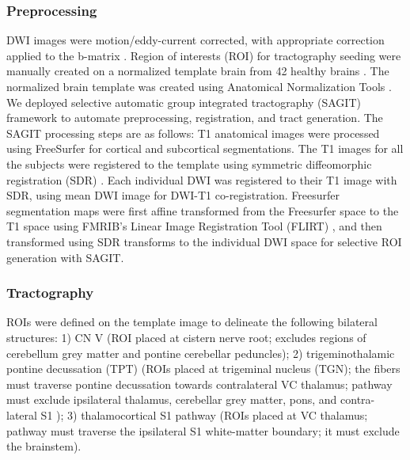 \subsubsection{Preprocessing}
DWI images were motion/eddy-current corrected, with appropriate correction applied to the b-matrix \cite{Leemans2009}. Region of interests (ROI) for tractography seeding were manually created on a normalized template brain from 42 healthy brains \cite{Chen2016}. The normalized brain template was created using Anatomical Normalization Tools \cite{Avants2010,Avants2011}. We deployed selective automatic group integrated tractography (SAGIT) framework \cite{Chen2016} to automate preprocessing, registration, and tract generation. The SAGIT processing steps are as follows: T1 anatomical images were processed using FreeSurfer \cite{Fischl2004} for cortical and subcortical segmentations. The T1 images for all the subjects were registered to the template using symmetric diffeomorphic registration (SDR) \cite{Avants2008b}. Each individual DWI was registered to their T1 image with SDR, using mean DWI image for DWI-T1 co-registration. Freesurfer segmentation maps were first affine transformed from the Freesurfer space to the T1 space using FMRIB's Linear Image Registration Tool (FLIRT) \cite{Jenkinson2001,Jenkinson2002}, and then transformed using SDR transforms to the individual DWI space for selective ROI generation with SAGIT.

\subsubsection{Tractography}
ROIs were defined on the template image to delineate the following bilateral structures: 1) CN V (ROI placed at cistern nerve root; excludes regions of cerebellum grey matter and pontine cerebellar peduncles); 2) trigeminothalamic pontine decussation (TPT) (ROIs placed at trigeminal nucleus (TGN); the fibers must traverse pontine decussation towards contralateral VC thalamus; pathway must exclude ipsilateral thalamus, cerebellar grey matter, pons, and contra-lateral S1 ); 3) thalamocortical S1 pathway (ROIs placed at VC thalamus; pathway must traverse the ipsilateral S1 white-matter boundary; it must exclude the brainstem).  

